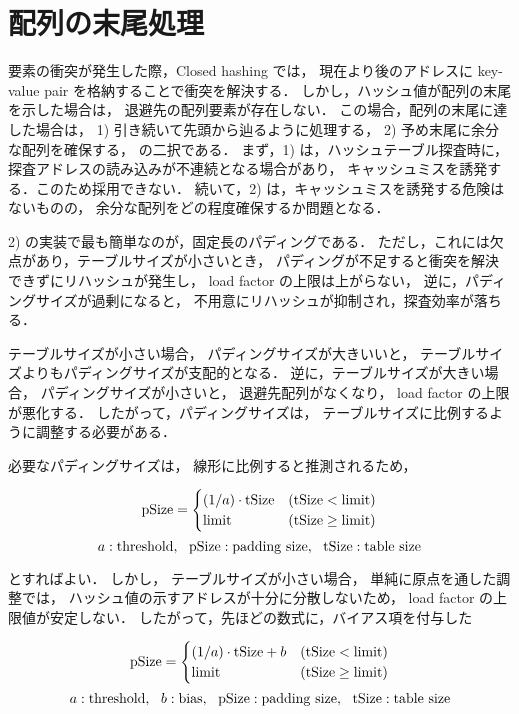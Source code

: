 \section{配列の末尾処理}

要素の衝突が発生した際，Closed hashing では，
現在より後のアドレスに key-value pair を格納することで衝突を解決する．
しかし，ハッシュ値が配列の末尾を示した場合は，
退避先の配列要素が存在しない．
この場合，配列の末尾に達した場合は，
1) 引き続いて先頭から辿るように処理する，
2) 予め末尾に余分な配列を確保する，
の二択である．
まず，1) は，ハッシュテーブル探査時に，
探査アドレスの読み込みが不連続となる場合があり，
キャッシュミスを誘発する．このため採用できない．
続いて，2) は，キャッシュミスを誘発する危険はないものの，
余分な配列をどの程度確保するか問題となる．

2) の実装で最も簡単なのが，固定長のパディングである．
ただし，これには欠点があり，テーブルサイズが小さいとき，
パディングが不足すると衝突を解決できずにリハッシュが発生し，
load factor の上限は上がらない，
逆に，パディングサイズが過剰になると，
不用意にリハッシュが抑制され，探査効率が落ちる．

テーブルサイズが小さい場合，
パディングサイズが大きいいと，
テーブルサイズよりもパディングサイズが支配的となる．
逆に，テーブルサイズが大きい場合，
パディングサイズが小さいと，
退避先配列がなくなり，
load factor の上限が悪化する．
したがって，パディングサイズは，
テーブルサイズに比例するように調整する必要がある．

必要なパディングサイズは，
線形に比例すると推測されるため，

\[
  {\rm pSize} = \begin{cases}
    (1/a) \cdot {\rm tSize} & ({\rm tSize}<{\rm limit}) \\
    {\rm limit}    & ({\rm tSize}\geq{\rm limit})
  \end{cases}
\]
\[
  a: {\rm threshold}, \ \ 
  {\rm pSize}: {\rm padding \ size}, \ \ 
  {\rm tSize: table \ size}
\]

とすればよい．
しかし，
テーブルサイズが小さい場合，
単純に原点を通した調整では，
ハッシュ値の示すアドレスが十分に分散しないため，
load factor の上限値が安定しない．
したがって，先ほどの数式に，バイアス項を付与した

\[
  {\rm pSize} = \begin{cases}
    (1/a) \cdot {\rm tSize} + b & ({\rm tSize}<{\rm limit}) \\
    {\rm limit}    & ({\rm tSize}\geq{\rm limit})
  \end{cases}
\]
\[
  a: {\rm threshold}, \ \ 
  b: {\rm bias}, \ \ 
  {\rm pSize}: {\rm padding \ size}, \ \ 
  {\rm tSize}: {\rm table \ size}
\]

